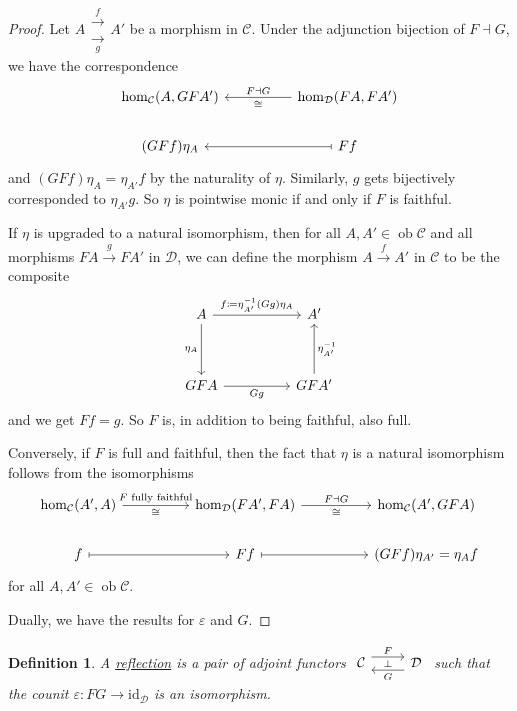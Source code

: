 \documentclass[a4paper,11pt]{article}
\theoremstyle{break_italics}
\newtheorem*{definition*}{Definition}
\theoremstyle{break_upright}
\theoremstyle{remark}
\newcommand{\id}{\mathrm{id}}
\newcommand{\ob}{\operatorname{ob}}
\newcommand{\C}{\mathcal{C}}
\newcommand{\D}{\mathcal{D}}
\begin{document}
\begin{proof}
	Let $A \substack{\xrightarrow{f} \\ \xrightarrow[g]{}} A'$ be a morphism in $\C$. Under the adjunction bijection of $F \dashv G$, we have the correspondence
	\[
\begin{tikzcd}
{\hom_\C(A, GFA')} &  & {\hom_\D(FA, FA')} \arrow[ll, "F \dashv G"',"\cong"] \\
(GFf)\eta_A &  & Ff \arrow[ll, maps to]                 
\end{tikzcd}
	\]
	and $(GFf)\eta_A = \eta_{A'}f$ by the naturality of $\eta$. Similarly, $g$ gets bijectively corresponded to $\eta_{A'}g$. So $\eta$ is pointwise monic if and only if $F$ is faithful.
	
	If $\eta$ is upgraded to a natural isomorphism, then for all $A,A'\in\ob\C$ and all morphisms $FA \xrightarrow{g} FA'$ in $\D$, we can define the morphism $A \xrightarrow{f} A'$ in $\C$ to be the composite
	\[
\begin{tikzcd}
A \arrow[rr, "f \coloneqq \eta_{A'}^{-1}(Gg)\eta_A"] \arrow[dd, "\eta_A"'] &  & A' \\ &  &  \\ GFA \arrow[rr, "Gg"']    &  & GFA' \arrow[uu, "\eta_{A'}^{-1}"']
\end{tikzcd}
	\]
	and we get $Ff = g$. So $F$ is, in addition to being faithful, also full.
	
	Conversely, if $F$ is full and faithful, then the fact that $\eta$ is a natural isomorphism follows from the isomorphisms
\[\begin{tikzcd}
	{\hom_\C(A',A)} && {\hom_\D(FA',FA)} && {\hom_\C(A', GFA)} \\
	f && Ff && {(GFf)\eta_{A'} = \eta_Af}
	\arrow["F \text{ fully faithful}","\cong"', from=1-1, to=1-3]
	\arrow["F \dashv G", "\cong"', from=1-3, to=1-5]
	\arrow[maps to, from=2-1, to=2-3]
	\arrow[maps to, from=2-3, to=2-5]
\end{tikzcd}\]
	for all $A,A'\in\ob\C$.
	
	Dually, we have the results for $\varepsilon$ and $G$.
\end{proof}

\begin{definition*}
	A \uline{reflection} is a pair of adjoint functors $\begin{tikzcd}
	\C & \D
	\arrow["\bot"{description}, draw=none, from=1-1, to=1-2]
	\arrow["F", shift left=2, from=1-1, to=1-2]
	\arrow["G", shift left=2, from=1-2, to=1-1]
\end{tikzcd}$ such that the counit $\varepsilon \colon FG \to \id_\D$ is an isomorphism.
\end{definition*}
\end{document}
